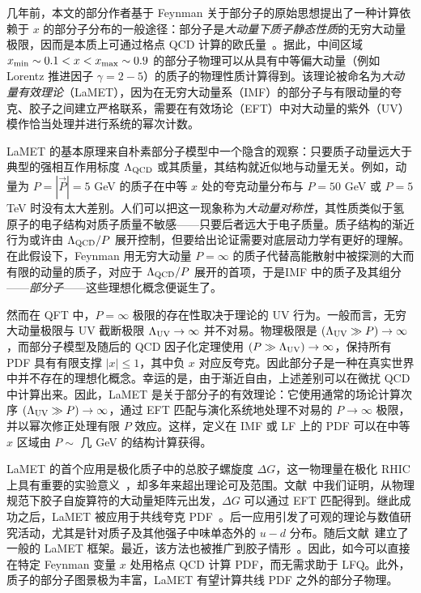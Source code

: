 几年前，本文的部分作者基于 Feynman 关于部分子的原始思想提出了一种计算依赖于 $x$ 的部分子分布的一般途径：部分子是{\it 大动量下质子静态性质}的无穷大动量极限，因而是本质上可通过格点 QCD 计算的欧氏量~\cite{Ji:2013dva,Ji:2013fga,Ji:2014gla}。据此，中间区域 $x_{\rm min}\sim 0.1 <x<x_{\rm max}\sim 0.9$ 的部分子物理可以从具有中等偏大动量（例如 Lorentz 推进因子 $\gamma=2-5$）的质子的物理性质计算得到。该理论被命名为{\it 大动量有效理论}（LaMET），因为在无穷大动量系（IMF）的部分子与有限动量的夸克、胶子之间建立严格联系，需要在有效场论（EFT）中对大动量的紫外（UV）模作恰当处理并进行系统的幂次计数。

LaMET 的基本原理来自朴素部分子模型中一个隐含的观察：只要质子动量远大于典型的强相互作用标度 $\Lambda_{\rm QCD}$ 或其质量，其结构就近似地与动量无关。例如，动量为 $P=|\vec{P}|=5$ GeV 的质子在中等 $x$ 处的夸克动量分布与 $P=50$ GeV 或 $P=5$ TeV 时没有太大差别。人们可以把这一现象称为{\it 大动量对称性}，其性质类似于氢原子的电子结构对质子质量不敏感——只要后者远大于电子质量。质子结构的渐近行为或许由 $\Lambda_{\rm QCD}/P$ 展开控制，但要给出论证需要对底层动力学有更好的理解。在此假设下，Feynman 用无穷大动量 $P=\infty$ 的质子代替高能散射中被探测的大而有限的动量的质子，对应于 $\Lambda_{\rm QCD}/P$ 展开的首项，于是{\rm IMF 中的质子}及其组分——{\it 部分子}——这些理想化概念便诞生了。

然而在 QFT 中，$P=\infty$ 极限的存在性取决于理论的 UV 行为。一般而言，无穷大动量极限与 UV 截断极限 $\Lambda_{\rm UV}\to \infty$ 并不对易。物理极限是 $(\Lambda_{\rm UV}\gg P) \to\infty$，而部分子模型及随后的 QCD 因子化定理使用 $(P\gg\Lambda_{\rm UV})\to\infty$，保持所有 PDF 具有有限支撑 $|x|\le 1$，其中负 $x$ 对应反夸克。因此部分子是一种在真实世界中并不存在的理想化概念。幸运的是，由于渐近自由，上述差别可以在微扰 QCD 中计算出来。因此，LaMET 是关于部分子的有效理论：它使用通常的场论计算次序 $(\Lambda_{\rm UV}\gg P)\to\infty$，通过 EFT 匹配与演化系统地处理不对易的 $P\to\infty$ 极限，并以幂次修正处理有限 $P$ 效应。这样，定义在 IMF 或 LF 上的 PDF 可以在中等 $x$ 区域由 $P\sim $ 几 GeV 的结构计算获得。

LaMET 的首个应用是极化质子中的总胶子螺旋度 $\Delta G$，这一物理量在极化 RHIC 上具有重要的实验意义~\cite{Bunce:2000uv}，却多年来超出理论可及范围。文献~\cite{Ji:2013fga}中我们证明，从物理规范下胶子自旋算符的大动量矩阵元出发，$\Delta G$ 可以通过 EFT 匹配得到。继此成功之后，LaMET 被应用于共线夸克 PDF~\cite{Ji:2013dva}。后一应用引发了可观的理论与数值研究活动，尤其是针对质子及其他强子中味单态外的 $u-d$ 分布。随后文献~\cite{Ji:2014gla}建立了一般的 LaMET 框架。最近，该方法也被推广到胶子情形~\cite{Zhang:2018diq,Li:2018tpe}。因此，如今可以直接在特定 Feynman 变量 $x$ 处用格点 QCD 计算 PDF，而无需求助于 LFQ。此外，质子的部分子图景极为丰富，LaMET 有望计算共线 PDF 之外的部分子物理。


